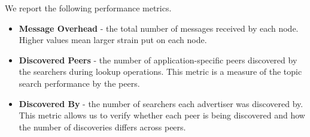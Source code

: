 

 We report the following performance metrics. 
 \begin{itemize}
     \item \textbf{Message Overhead} - the total number of messages received by each node. 
Higher values mean larger strain put on each node. 
     \item \textbf{Discovered Peers} - the number of application-specific peers discovered by the searchers during lookup operations. This metric is a measure of the topic search performance by the peers.
     \item \textbf{Discovered By} - the number of searchers each advertiser was discovered by. This metric allows us to verify whether each peer is being discovered and how the number of discoveries differs across peers.
 \end{itemize}
 
